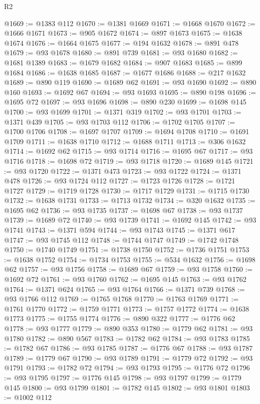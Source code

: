 \begin{lexlean}{R2}
\begin{coremodule}
@1669 := @1383 @112
@1670 := @1381 @1669
@1671 := @1668 @1670
@1672 := @1666 @1671
@1673 := @905 @1672
@1674 := @897 @1673
@1675 := @1638 @1674
@1676 := @1664 @1675
@1677 := @194 @1632
@1678 := @891 @478
@1679 := @93 @1678
@1680 := @891 @739
@1681 := @93 @1680
@1682 := @1681 @1389
@1683 := @1679 @1682
@1684 := @907 @1683
@1685 := @899 @1684
@1686 := @1638 @1685
@1687 := @1677 @1686
@1688 := @217 @1632
@1689 := @890 @119
@1690 := @1689 @62
@1691 := @93 @1690
@1692 := @890 @160
@1693 := @1692 @67
@1694 := @93 @1693
@1695 := @890 @198
@1696 := @1695 @72
@1697 := @93 @1696
@1698 := @890 @230
@1699 := @1698 @145
@1700 := @93 @1699
@1701 := @1371 @319
@1702 := @93 @1701
@1703 := @1371 @439
@1705 := @93 @1703 @112
@1706 := @1702 @1705
@1707 := @1700 @1706
@1708 := @1697 @1707
@1709 := @1694 @1708
@1710 := @1691 @1709
@1711 := @1638 @1710
@1712 := @1688 @1711
@1713 := @306 @1632
@1714 := @1692 @62
@1715 := @93 @1714
@1716 := @1695 @67
@1717 := @93 @1716
@1718 := @1698 @72
@1719 := @93 @1718
@1720 := @1689 @145
@1721 := @93 @1720
@1722 := @1371 @473
@1723 := @93 @1722
@1724 := @1371 @478
@1726 := @93 @1724 @112
@1727 := @1723 @1726
@1728 := @1721 @1727
@1729 := @1719 @1728
@1730 := @1717 @1729
@1731 := @1715 @1730
@1732 := @1638 @1731
@1733 := @1713 @1732
@1734 := @320 @1632
@1735 := @1695 @62
@1736 := @93 @1735
@1737 := @1698 @67
@1738 := @93 @1737
@1739 := @1689 @72
@1740 := @93 @1739
@1741 := @1692 @145
@1742 := @93 @1741
@1743 := @1371 @594
@1744 := @93 @1743
@1745 := @1371 @617
@1747 := @93 @1745 @112
@1748 := @1744 @1747
@1749 := @1742 @1748
@1750 := @1740 @1749
@1751 := @1738 @1750
@1752 := @1736 @1751
@1753 := @1638 @1752
@1754 := @1734 @1753
@1755 := @534 @1632
@1756 := @1698 @62
@1757 := @93 @1756
@1758 := @1689 @67
@1759 := @93 @1758
@1760 := @1692 @72
@1761 := @93 @1760
@1762 := @1695 @145
@1763 := @93 @1762
@1764 := @1371 @624
@1765 := @93 @1764
@1766 := @1371 @739
@1768 := @93 @1766 @112
@1769 := @1765 @1768
@1770 := @1763 @1769
@1771 := @1761 @1770
@1772 := @1759 @1771
@1773 := @1757 @1772
@1774 := @1638 @1773
@1775 := @1755 @1774
@1776 := @890 @322
@1777 := @1776 @62
@1778 := @93 @1777
@1779 := @890 @353
@1780 := @1779 @62
@1781 := @93 @1780
@1782 := @890 @567
@1783 := @1782 @62
@1784 := @93 @1783
@1785 := @1782 @67
@1786 := @93 @1785
@1787 := @1776 @67
@1788 := @93 @1787
@1789 := @1779 @67
@1790 := @93 @1789
@1791 := @1779 @72
@1792 := @93 @1791
@1793 := @1782 @72
@1794 := @93 @1793
@1795 := @1776 @72
@1796 := @93 @1795
@1797 := @1776 @145
@1798 := @93 @1797
@1799 := @1779 @145
@1800 := @93 @1799
@1801 := @1782 @145
@1802 := @93 @1801
@1803 := @1002 @112

\end{coremodule}
\end{lexlean}
